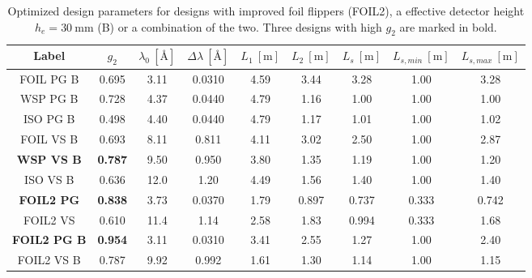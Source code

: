 \begin{table}[h!]
\centering
\begin{tabular}{c | c | c c c c c | c c}
	\toprule
	Label & $g_2$ & $\lambda_0 ~[\unit{\angstrom}]$ & $\Delta\lambda ~[\unit{\angstrom}]$ & $L_1 ~[\unit{\meter}]$ & $L_2 ~[\unit{\meter}]$ & $L_s  ~[\unit{\meter}]$ & $L_{s,min}  ~[\unit{\meter}]$& $L_{s, max}  ~[\unit{\meter}]$\\
	\midrule
	FOIL PG B & \num{0.695} & \num{3.11} & \num{0.0310} & \num{4.59} & \num{3.44} & \num{3.28} & \num{1.00} & \num{3.28} \\
	WSP PG B & \num{0.728} & \num{4.37} & \num{0.0440} & \num{4.79} & \num{1.16} & \num{1.00} & \num{1.00} & \num{1.00} \\
	ISO PG B & \num{0.498} & \num{4.40} & \num{0.0440} & \num{4.79} & \num{1.17} & \num{1.01} & \num{1.00} & \num{1.02} \\
	FOIL VS B & \num{0.693} & \num{8.11} & \num{0.811} & \num{4.11} & \num{3.02} & \num{2.50} & \num{1.00} & \num{2.87} \\
	\textbf{WSP VS B} & \textbf{0.787} & \num{9.50} & \num{0.950} & \num{3.80} & \num{1.35} & \num{1.19} & \num{1.00} & \num{1.20} \\
	ISO VS B & \num{0.636} & \num{12.0} & \num{1.20} & \num{4.49} & \num{1.56} & \num{1.40} & \num{1.00} & \num{1.40} \\
	\midrule
	\textbf{FOIL2 PG} & \textbf{0.838} & \num{3.73} & \num{0.0370} & \num{1.79} & \num{0.897} & \num{0.737} & \num{0.333} & \num{0.742} \\
	FOIL2 VS & \num{0.610} & \num{11.4} & \num{1.14} & \num{2.58} & \num{1.83} & \num{0.994} & \num{0.333} & \num{1.68} \\
	\textbf{FOIL2 PG B} & \textbf{0.954} & \num{3.11} & \num{0.0310} & \num{3.41} & \num{2.55} & \num{1.27} & \num{1.00} & \num{2.40} \\
	FOIL2 VS B & \num{0.787} & \num{9.92} & \num{0.992} & \num{1.61} & \num{1.30} & \num{1.14} & \num{1.00} & \num{1.15} \\
	\bottomrule
\end{tabular}
\caption{Optimized design parameters for designs with improved foil flippers (FOIL2), a effective detector height $h_e = \SI{30}{\milli\meter}$ (B) or a combination of the two. Three designs with high $g_2$ are marked in bold.}
\label{tab:optimized-designs-boost}
\end{table}

